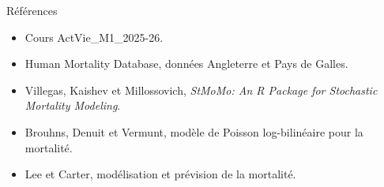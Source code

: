 \documentclass[11pt,aspectratio=169]{beamer}
\begin{document}
\begin{frame}{Références}
  \begin{itemize}
    \item Cours ActVie\_M1\_2025-26.
    \item Human Mortality Database, données Angleterre et Pays de Galles.
    \item Villegas, Kaishev et Millossovich, \emph{StMoMo: An R Package for Stochastic Mortality Modeling}.
    \item Brouhns, Denuit et Vermunt, modèle de Poisson log-bilinéaire pour la mortalité.
    \item Lee et Carter, modélisation et prévision de la mortalité.
  \end{itemize}
\end{frame}
\end{document}
